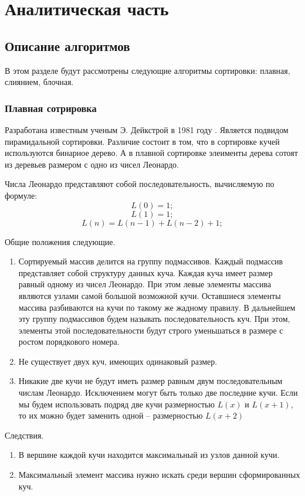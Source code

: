 \chapter{Аналитическая часть}

\section{Описание алгоритмов}
В этом разделе будут рассмотрены следующие алгоритмы сортировки: плавная, слиянием, блочная.

\subsection{Плавная сотрировка}
Разработана известным ученым Э. Дейкстрой в 1981 году \cite{ss}.
Является подвидом пирамидальной сортировки. Различие состоит в том, что в сортировке кучей используются бинарное дерево. А в плавной сортировке элеименты дерева сотоят из деревьев размером с одно из чисел Леонардо. 

Числа Леонардо представляют собой последовательность, вычисляемую по формуле:
\[L(0) = 1;\]
\[L(1) = 1;\]
\[L(n) = L(n-1) + L (n-2) + 1;\]

Общие положения следующие.
\begin{enumerate}
\item Сортируемый массив делится на группу подмассивов. Каждый подмассив представляет собой структуру данных куча. Каждая куча имеет размер равный одному из чисел Леонардо. При этом левые элементы массива являются узлами самой большой возможной кучи. Оставшиеся элементы массива разбиваются на кучи по такому же жадному правилу. В дальнейшем эту группу подмассивов будем называть последовательность куч. При этом, элементы этой последовательности будут строго уменьшаться в размере с ростом порядкового номера.
\item Не существует двух куч, имеющих одинаковый размер.
\item Никакие две кучи не будут иметь размер равным двум последовательным числам Леонардо. Исключением могут быть только две последние кучи.
Если мы будем использовать подряд две кучи размерностью $L(x)$ и $L(x+1)$, то их можно будет заменить одной – размерностью $L(x+2)$
\end{enumerate}

Следствия.
\begin{enumerate}
\item В вершине каждой кучи находится максимальный из узлов данной кучи.
\item Максимальный элемент массива нужно искать среди вершин сформированных куч.
\end{enumerate}

